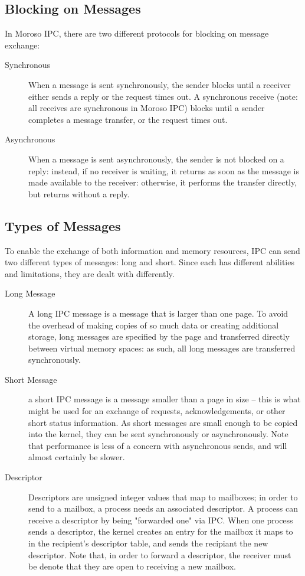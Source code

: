 \documentclass{article}
\begin{document}
\subsection{Blocking on Messages}
In Moroso IPC, there are two different protocols for blocking on message exchange:
\begin{description}
\item[Synchronous] When a message is sent synchronously, the sender blocks until a receiver either sends a reply or the request times out.  A synchronous receive (note: all receives are synchronous in Moroso IPC) blocks until a sender completes a message transfer, or the request times out.
\item[Asynchronous] When a message is sent asynchronously, the sender is not blocked on a reply: instead, if no receiver is waiting, it returns as soon as the message is made available to the receiver: otherwise, it performs the transfer   directly, but returns without a reply.
\end{description}

\subsection{Types of Messages}
To enable the exchange of both information and memory resources, IPC can send two different types of messages: long and short.  Since each has different abilities and limitations, they are dealt with differently. 
\begin{description}
\item[Long Message] A long IPC message is a message that is larger than one page.  To avoid the overhead of making copies of so much data or creating additional storage, long messages are specified by the page and transferred directly between virtual memory spaces: as such, all long messages are transferred synchronously.  
\item[Short Message]  a short IPC message is a message smaller than a page in size -- this is what might be used for an exchange of requests, acknowledgements, or other short status information.  As short messages are small enough to be copied into the kernel, they can be sent synchronously or asynchronously.  Note that performance is less of a concern with asynchronous sends, and will almost certainly be slower.  
\item[Descriptor] Descriptors are unsigned integer values that map to mailboxes; in order to send to a mailbox, a process needs an associated descriptor.  A process can receive a descriptor by being "forwarded one" via IPC.  When one process sends a descriptor, the kernel creates an entry for the mailbox it maps to in the recipient's descriptor table, and sends the recipiant the new descriptor.  Note that, in order to forward a descriptor, the receiver must be denote that they are open to receiving a new mailbox.
   
\end{description}
\end{document}
